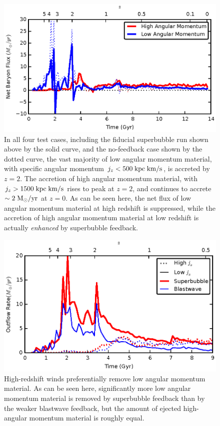 \begin{figure}
    \includegraphics[width=\textwidth]{figures2/angular_momentum_netflux.eps}
    \caption[Net accretion as a function of angular momentum]{In all four test
    cases, including the fiducial superbubble run shown above by the solid
    curve, and the no-feedback case shown by the dotted curve, the vast majority
    of low angular momentum material, with specific angular momentum $ j_z <
    500\; \rm {kpc\; km/s}$, is accreted by $z=2$.  The accretion of high
    angular momentum material, with $j_z > 1500\; \rm{kpc\; km/s}$ rises to peak
    at $z=2$, and continues to accrete $\sim 2\; \rm{M_\odot/yr}$ at $z=0$.  As
    can be seen here, the net flux of low angular momentum material at high
    redshift is suppressed, while the accretion of high angular momentum
    material at low redshift is actually {\it enhanced} by superbubble
    feedback.}
        \label{angular_momentum_netflux}
\end{figure}
\begin{figure}
    \includegraphics[width=\textwidth]{figures2/angular_momentum_outflow.eps}
    \caption[High redshift winds remove low angular momentum gas]{High-redshift
    winds preferentially remove low angular momentum material.  As can be seen
    here, significantly more low angular momentum material is removed by
    superbubble feedback than by the weaker blastwave feedback, but the amount
    of ejected high-angular momentum material is roughly equal.}
        \label{angular_momentum_outflow}
\end{figure}
